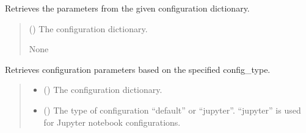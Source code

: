 \documentclass[a4paper,11pt,english,openany]{sphinxmanual}
\begin{document}
\begin{fulllineitems}
\begin{fulllineitems}
\label{\detokenize{api/spyice.utils.config_sort:id2}}
\pysigstartsignatures
\pysiglinewithargsret
{}
{}
{}
\pysigstopsignatures
\sphinxAtStartPar
Retrieves the parameters from the given configuration dictionary.
\begin{quote}\begin{description}
\sphinxAtStartPar
{} () \textendash{} The configuration dictionary.

\sphinxAtStartPar
None

\end{description}\end{quote}

\end{fulllineitems}


\begin{fulllineitems}
\label{\detokenize{api/spyice.utils.config_sort:id3}}
\pysigstartsignatures
\pysiglinewithargsret
{}
{\sphinxparamcomma {}}
{}
\pysigstopsignatures
\sphinxAtStartPar
Retrieves configuration parameters based on the specified config\_type.
\begin{quote}\begin{description}
\begin{itemize}
\item {} 
\sphinxAtStartPar
{} () \textendash{} The configuration dictionary.

\item {} 
\sphinxAtStartPar
{} () \textendash{} The type of configuration “default” or “jupyter”.
“jupyter” is used for Jupyter notebook configurations.


\end{itemize}
\end{description}
\end{quote}
\end{fulllineitems}
\end{fulllineitems}
\end{document}
